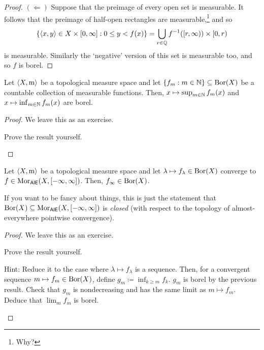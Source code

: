 \begin{prp}
\begin{proof}
\blankline
\noindent
$(\Leftarrow )$ Suppose that the preimage of every open set is measurable.  It follows that the preimage of half-open rectangles are measurable,\footnote{Why?} and so
\begin{equation}
\left\{ \langle x,y\rangle\in X\times [0,\infty ]:0\leq y<f(x)\right\} =\bigcup _{r\in \mathbb{Q}}f^{-1}([r,\infty ))\times [0,r)
\end{equation}
is measurable.  Similarly the `negative' version of this set is measurable too, and so $f$ is borel.
\end{proof}
\end{prp}

\begin{prp}\label{SupInfBorelIsBorel}
Let $\langle X,\mathrm{m}\rangle$ be a topological measure space and let $\{ f_m:m\in \mathbb{N} \} \subseteq \operatorname{Bor} (X)$ be a countable collection of measurable functions.  Then, $x\mapsto \sup _{m\in \mathbb{N}}f_m(x)$ and $x\mapsto \inf _{m\in \mathbb{N}}f_m(x)$ are borel.
\begin{proof}
We leave this as an exercise.
\begin{exr}
Prove the result yourself.
\end{exr}
\end{proof}
\end{prp}
\begin{prp}\label{LimitBorelIsBorel}
Let $\langle X,\mathrm{m}\rangle$ be a topological measure space and let $\lambda \mapsto f_\lambda \in \operatorname{Bor} (X)$ converge to $f\in \operatorname{Mor} _{\mathsf{AlE}}(X,[-\infty ,\infty ])$.  Then, $f_\infty \in \operatorname{Bor} (X)$.
\begin{rmk}
If you want to be fancy about things, this is just the statement that $\operatorname{Bor} (X)\subseteq \operatorname{Mor} _{\mathsf{AlE}}(X,[-\infty ,\infty ])$ is \emph{closed} (with respect to the topology of almost-everywhere pointwise convergence).
\end{rmk}
\begin{proof}
We leave this as an exercise.
\begin{exr}
Prove the result yourself.
\begin{rmk}
Hint:  Reduce it to the case where $\lambda \mapsto f_\lambda$ is a sequence.  Then, for a convergent sequence $m\mapsto f_m\in \operatorname{Bor} (X)$, define $g_m\coloneqq \inf _{k\geq m}f_k$.  $g_m$ is borel by the previous result.  Check that $g_m$ is nondecreasing and has the same limit as $m\mapsto f_m$.  Deduce that $\lim _mf_m$ is borel.
\end{rmk}
\end{exr}
\end{proof}
\end{prp}
